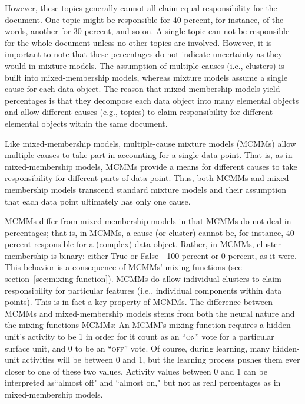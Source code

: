 However, these topics generally cannot all claim equal responsibility
for the document. One topic might be responsible for 40 percent, for instance,
of the words, another for 30 percent, and so on. A single topic can not be responsible for the whole 
document unless no other topics are involved.  However, it is important to note that these 
percentages do not indicate uncertainty as they would in mixture models. The assumption
of multiple causes (i.e., clusters) is built 
into mixed-membership models, whereas mixture models assume a single cause for each 
data object. The reason that mixed-membership models yield percentages is 
that they decompose each data object into many elemental objects and allow different causes (e.g., topics) to claim responsibility for different elemental objects within the same document. 

Like mixed-membership models, multiple-cause mixture models (MCMMs) allow multiple causes to take part in accounting for a single data point. That is, as in mixed-membership models, MCMMs provide a means for different causes to take responsibility for different parts of data point. Thus, both MCMMs and mixed-membership models transcend standard mixture models and their assumption that each data point ultimately has only one cause. %

MCMMs differ from mixed-membership models in that MCMMs do not deal in 
percentages; that is, in MCMMs, a cause (or cluster) cannot be, for instance, 
40 percent responsible for a (complex) data object. Rather, in MCMMs, 
cluster membership is binary: either True or False---100 percent or 0 percent, as it were. 
This behavior is a consequence of MCMMs' mixing functions (see section~\ref{sec:mixing-function}). 
MCMMs do allow individual clusters to claim responsibility for particular features (i.e., individual components within data points). This is in fact a key property of MCMMs. 
The difference between MCMMs and mixed-membership models stems from 
both the neural nature and the mixing functions MCMMs: An MCMM's mixing 
function requires a hidden unit's activity to be 1 in order for it count as an 
``\textsc{on}'' vote for a particular surface unit, and 0 to be an ``\textsc{off}'' vote. 
Of course, during learning, many hidden-unit activities will be between 0 and 1, 
but the learning process pushes them ever closer to one of these two values. 
Activity values between 0 and 1 can be interpreted as``almost off" and ``almost on," 
but not as real percentages as in mixed-membership models. 

